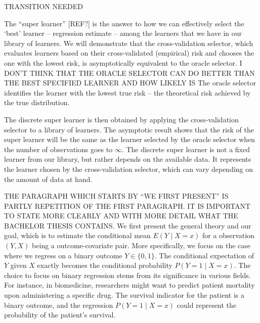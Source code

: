 \documentclass[11pt, a4paper]{article}
\renewcommand\tag[1]{\color{blue} #1 \color{black}}
\theoremstyle{definition}
\theoremstyle{remark}
\begin{document}
\tag{TRANSITION NEEDED}

The ``super learner'' [REF?] is the answer to how we can effectively
select the `best' learner -- regression estimate -- among the learners
that we have in our library of learners.  We will demonstrate that the
cross-validation selector, which evaluates learners based on their
cross-validated (empirical) risk and chooses the one with the lowest
risk, is asymptotically equivalent to the oracle selector.
\tag{I DON'T THINK THAT THE ORACLE SELECTOR CAN DO BETTER THAN
  THE BEST SPECIFIED LEARNER AND HOW LIKELY IS }
The oracle
selector identifies the learner with the lowest true risk – the
theoretical risk achieved by the true distribution.

The discrete super learner is then obtained by applying the
cross-validation selector to a library of learners. The asymptotic
result shows that the risk of the super learner will be the same as
the learner selected by the oracle selector when the number of
observations goes to $ \infty $. The discrete super learner is not a
fixed learner from our library, but rather depends on the available
data. It represents the learner chosen by the cross-validation
selector, which can vary depending on the amount of data at hand.

\tag{THE PARAGRAPH WHICH STARTS BY ``WE FIRST PRESENT'' IS
  PARTLY REPETITION OF THE FIRST PARAGRAPH. IT IS IMPORTANT TO STATE
  MORE CLEARLY AND WITH MORE DETAIL WHAT THE BACHELOR THESIS
  CONTAINS.}
We first present the general theory and our goal, which
is to estimate the conditional mean $ E(Y \mid X = x) $ for a
observation $ (Y, X) $ being a outcome-covariate pair. More
specifically, we focus on the case where we regress on a binary
outcome $ Y \in \{0,1\} $. The conditional expectation of $ Y $ given
$ X $ exactly becomes the conditional probability
$ P(Y = 1 \mid X = x) $. The choice to focus on binary regression
stems from its significance in various fields. For instance, in
biomedicine, researchers might want to predict patient mortality upon
administering a specific drug. The survival indicator for the patient
is a binary outcome, and the regression $ P(Y = 1 \mid X = x) $ could
represent the probability of the patient's survival.
\end{document}

